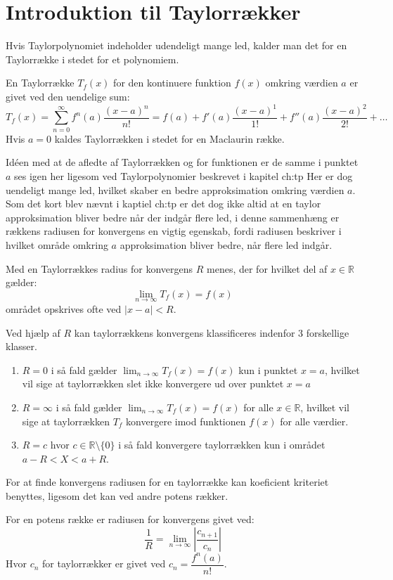 \chapter{Introduktion til Taylorrækker} %
\label{ch:tr}
Hvis Taylorpolynomiet indeholder udendeligt mange led, 
kalder man det for en Taylorrække i stedet for et polynomiem. 
\begin{defn}
    En Taylorrække $T_f(x)$ for den kontinuere funktion $f(x)$ omkring værdien $a$ er givet ved den uendelige sum:
    \[
        T_f(x) = \sum^{\infty}_{n=0} f^n(a) \frac{(x-a)^{n}}{n!} = f(a) + f'(a) \frac{(x-a)^{1}}{1!} + 
        f''(a) \frac{(x-a)^{2}}{2!} + \ldots
    \]
    Hvis $a = 0$ kaldes Taylorrækken i stedet for en Maclaurin række.
\end{defn}
\label{def:taylorrække}
Idéen med at de afledte af Taylorrækken og for funktionen er de samme i punktet $a$ 
ses igen her ligesom ved Taylorpolynomier beskrevet i kapitel \refname{ch:tp}
Her er dog uendeligt mange led, hvilket skaber en bedre approksimation omkring værdien $a$. 
Som det kort blev nævnt i kaptiel \refname{ch:tp} er det dog ikke altid at en taylor approksimation bliver bedre
når der indgår flere led, i denne sammenhæng er rækkens radiusen for konvergens en vigtig egenskab,
fordi radiusen beskriver i hvilket område omkring $a$ approksimation bliver bedre, når flere led indgår.
\begin{defn} %
    Med en Taylorrækkes radius for konvergens $R$ menes, der for hvilket del af $x \in \mathbb{R}$ gælder:
    \[
        \lim_{n \rightarrow \infty} T_f(x) = f(x)
    \]
    området opskrives ofte ved $|x-a| < R$.
\end{defn}
Ved hjælp af $R$ kan taylorrækkens konvergens klassificeres indenfor 3 forskellige klasser.
\begin{enumerate} %
    \item $R = 0$ i så fald gælder $\lim_{n \rightarrow \infty} T_f(x) = f(x)$ kun i punktet $x = a$,
    hvilket vil sige at taylorrækken slet ikke konvergere ud over punktet $x = a$
    \item $R = \infty$ i så fald gælder $\lim_{n \rightarrow \infty} T_f(x) = f(x)$ for alle $x \in \mathbb{R}$,
    hvilket vil sige at taylorrækken $T_f$ konvergere imod funktionen $f(x)$ for alle værdier.
    \item $R = c$ hvor $c \in \mathbb{R}\setminus\{0\}$ i så fald konvergere taylorrækken kun i området $a - R < X < a + R$.
\end{enumerate}
For at finde konvergens radiusen for en taylorrække kan koeficient kriteriet benyttes, ligesom det kan ved andre potens rækker.
\begin{defn} %
    For en potens række er radiusen for konvergens givet ved:
    \[
        \frac{1}{R} = \lim_{n \rightarrow \infty} \left\lvert \frac{c_{n + 1}}{c_n} \right\lvert
    \]
    Hvor $c_n$ for taylorrækker er givet ved $c_n = \dfrac{f^n(a)}{n!}$.
\end{defn} %


